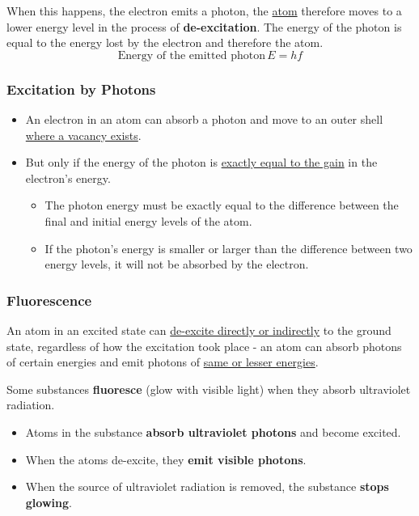 When this happens, the electron emits a photon, the \underline{atom} therefore moves to a lower energy level in the process of \textbf{de-excitation}. The energy of the photon is equal to the energy lost by the electron and therefore the atom.
$$\text{Energy of the emitted photon}\,E=hf$$

\subsubsection*{Excitation by Photons}
\begin{itemize}
    \item An electron in an atom can absorb a photon and move to an outer shell \underline{where a vacancy exists}.
    \item But only if the energy of the photon is \underline{exactly equal to the gain} in the electron's energy.
        \begin{itemize}
            \item The photon energy must be exactly equal to the difference between the final and initial energy levels of the atom.
            \item If the photon's energy is smaller or larger than the difference between two energy levels, it will not be absorbed by the electron.
        \end{itemize}
\end{itemize}

\subsubsection*{Fluorescence}
An atom in an excited state can \underline{de-excite directly or indirectly} to the ground state, regardless of how the excitation took place - an atom can absorb photons of certain energies and emit photons of \underline{same or lesser energies}.

Some substances \textbf{fluoresce} (glow with visible light) when they absorb ultraviolet radiation.
\begin{itemize}
    \item Atoms in the substance \textbf{absorb ultraviolet photons} and become excited.
    \item When the atoms de-excite, they \textbf{emit visible photons}.
    \item When the source of ultraviolet radiation is removed, the substance \textbf{stops glowing}.
\end{itemize}

